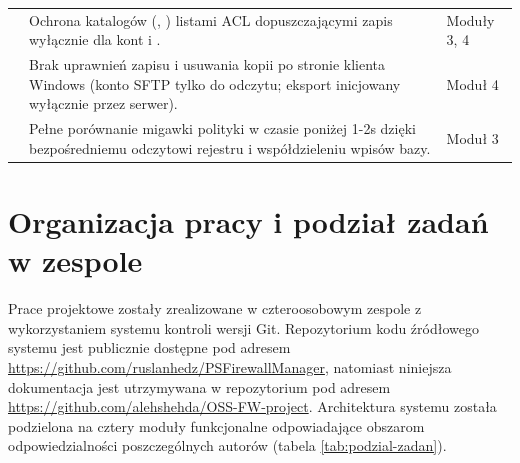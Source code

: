 \begin{table}[H]
\begin{tabularx}{\linewidth}{C{1.6cm} Y C{2.2cm}}
         & Ochrona katalogów (, ) listami ACL dopuszczającymi zapis wyłącznie dla kont  i . & Moduły 3, 4 \\
         & Brak uprawnień zapisu i usuwania kopii po stronie klienta Windows (konto SFTP tylko do odczytu; eksport inicjowany wyłącznie przez serwer). & Moduł 4 \\
         & Pełne porównanie migawki polityki w czasie poniżej 1-2s dzięki bezpośredniemu odczytowi rejestru i współdzieleniu wpisów bazy. & Moduł 3 \\
        \bottomrule
    \end{tabularx}
\end{table}

\section{Organizacja pracy i podział zadań w zespole}\label{sec:podzial-zadan}

Prace projektowe zostały zrealizowane w czteroosobowym zespole z wykorzystaniem systemu kontroli wersji Git. Repozytorium kodu źródłowego systemu \cite{psfirewallmanager-repo} jest publicznie dostępne pod adresem \url{https://github.com/ruslanhedz/PSFirewallManager}, natomiast niniejsza dokumentacja jest utrzymywana w repozytorium \cite{oss-fw-project-repo} pod adresem \url{https://github.com/alehshehda/OSS-FW-project}. Architektura systemu została podzielona na cztery moduły funkcjonalne odpowiadające obszarom odpowiedzialności poszczególnych autorów (tabela \ref{tab:podzial-zadan}).

